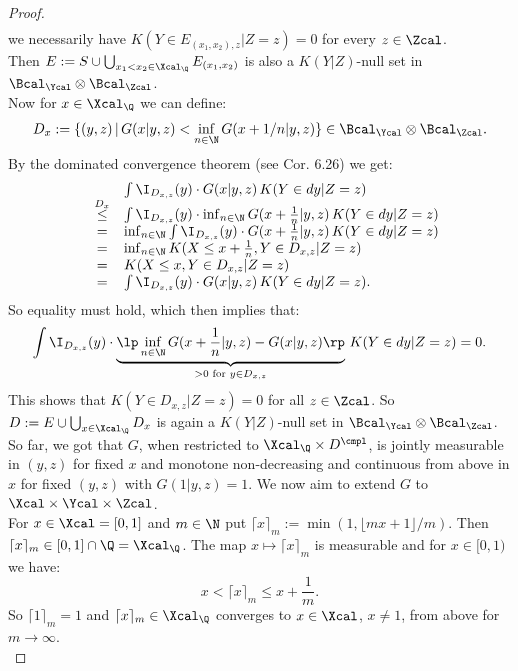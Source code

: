 \begin{Thm}
\begin{proof}
\[\begin{array}{rcl}
\end{array}\]
we necessarily have $ K(Y \in E_{(x_1,x_2),z} |Z=z) = 0$ for every $z \in \Zcal$.\\
Then $E:= S \cup  \bigcup_{x_1 < x_2 \in \Xcal_\Q} E_{(x_1,x_2)}$ is also a $ K(Y|Z)$-null set in $\Bcal_\Ycal \otimes \Bcal_\Zcal$.\\
Now for $x \in \Xcal_\Q$ we can define: 
\[ D_x := \{ (y,z) \,|\, G(x|y,z) <  \inf_{n \in \N} G(x+1/n|y,z)  \} \in \Bcal_\Ycal \otimes \Bcal_\Zcal.\]
By the dominated convergence theorem (see \cite{Kle20}  Cor. 6.26) we get:
\[ \begin{array}{rcl}
&&  \int \I_{D_{x,z}}(y) \cdot G(x|y,z) \,  K(Y \in dy|Z=z) \\
&\stackrel{D_x}{\le}& \int \I_{D_{x,z}}(y) \cdot \inf_{n \in \N} G(x+\frac{1}{n}|y,z) \,  K(Y \in dy|Z=z) \\
&=& \inf_{n \in \N} \int \I_{D_{x,z}}(y) \cdot G(x+\frac{1}{n}|y,z) \,  K(Y \in dy|Z=z) \\
&=& \inf_{n \in \N}  K(X \le x + \frac{1}{n}, Y \in D_{x,z} |Z=z) \\
&=&   K(X \le x, Y \in D_{x,z} |Z=z) \\
&=& \int \I_{D_{x,z}}(y) \cdot G(x|y,z) \,  K(Y \in dy|Z=z).
\end{array}\]
So equality must hold, which then implies that:
\[
    \int \I_{D_{x,z}}(y) \cdot \underbrace{\lp \inf_{n \in \N} G(x+\frac{1}{n}|y,z) - G(x|y,z) \rp}_{> 0 \text{ for } y \in D_{x,z}} \,  K(Y \in dy|Z=z) =0.
\]
This shows that $ K(Y \in D_{x,z}|Z=z)=0$ for all $z \in \Zcal$.
So $D:= E \cup \bigcup_{x \in \Xcal_\Q} D_x$ is again a $ K(Y|Z)$-null set in $\Bcal_\Ycal \otimes \Bcal_\Zcal$.\\
So far, we got that $G$, when restricted to $\Xcal_\Q \times D^\cmpl$,
is jointly measurable in $(y,z)$ for fixed $x$ and monotone non-decreasing and continuous from above in $x$ for fixed $(y,z)$ with $G(1|y,z)=1$.
We now aim to extend $G$ to $\Xcal \times \Ycal \times \Zcal$.\\
For  $x \in \Xcal =[0,1]$ and $m \in \N$ put $\lceil x\rceil_m:=\min(1,\lfloor mx+1\rfloor/m)$. 
Then $\lceil x\rceil_m \in [0,1] \cap \Q = \Xcal_\Q$. 
The map $x \mapsto \lceil x\rceil_m$ is measurable and for $x \in [0,1)$ we have: 
\[ x < \lceil x\rceil_m \le x + \frac{1}{m}.\]
So $\lceil 1\rceil_m=1$ and  $\lceil x\rceil_m \in \Xcal_\Q$ converges to $x \in \Xcal$, $x \neq 1$, from above for $m \to \infty$.\\

\end{proof}
\end{Thm}
